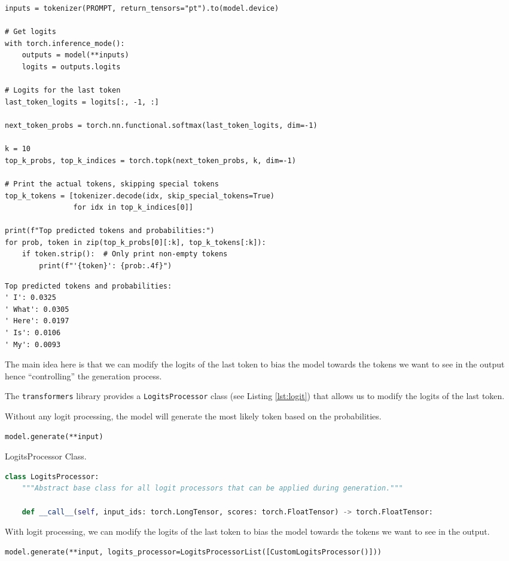 \begin{verbatim}
inputs = tokenizer(PROMPT, return_tensors="pt").to(model.device)

# Get logits
with torch.inference_mode():
    outputs = model(**inputs)
    logits = outputs.logits

# Logits for the last token
last_token_logits = logits[:, -1, :]

next_token_probs = torch.nn.functional.softmax(last_token_logits, dim=-1)

k = 10
top_k_probs, top_k_indices = torch.topk(next_token_probs, k, dim=-1)

# Print the actual tokens, skipping special tokens
top_k_tokens = [tokenizer.decode(idx, skip_special_tokens=True) 
                for idx in top_k_indices[0]]

print(f"Top predicted tokens and probabilities:")
for prob, token in zip(top_k_probs[0][:k], top_k_tokens[:k]):
    if token.strip():  # Only print non-empty tokens
        print(f"'{token}': {prob:.4f}")
\end{verbatim}

\begin{verbatim}
Top predicted tokens and probabilities:
' I': 0.0325
' What': 0.0305
' Here': 0.0197
' Is': 0.0106
' My': 0.0093
\end{verbatim}


The main idea here is that we can modify the logits of the last token to bias the model towards the tokens we want to see in the output hence ``controlling'' the generation process.

The \texttt{transformers} library provides a \texttt{LogitsProcessor} class (see Listing \ref{lst:logit}) that allows us to modify the logits of the last token.

Without any logit processing, the model will generate the most likely token based on the probabilities.
\begin{verbatim}
model.generate(**input)
\end{verbatim}
\begin{marginlisting}[-1.35cm]
	\caption{LogitsProcessor Class.}
    \label{lst:logit}
	\vspace{0.6cm}
	\begin{lstlisting}[language=Python,style=kaolstplain]
class LogitsProcessor:
    """Abstract base class for all logit processors that can be applied during generation."""

    def __call__(self, input_ids: torch.LongTensor, scores: torch.FloatTensor) -> torch.FloatTensor:
	\end{lstlisting}
\end{marginlisting}
With logit processing, we can modify the logits of the last token to bias the model towards the tokens we want to see in the output.
\begin{verbatim}
model.generate(**input, logits_processor=LogitsProcessorList([CustomLogitsProcessor()]))
\end{verbatim}

